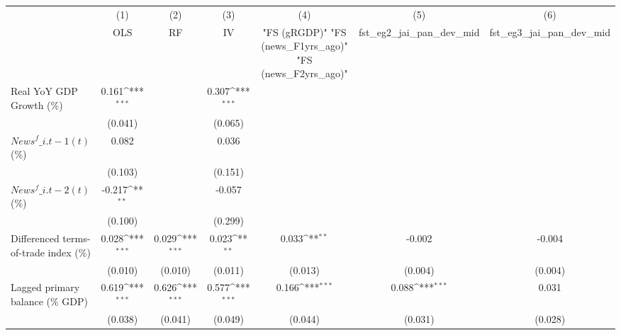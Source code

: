 {
\def\sym#1{\ifmmode^{#1}\else\(^{#1}\)\fi}
\begin{tabular}{l*{6}{c}}
\toprule
                    &\multicolumn{1}{c}{(1)}&\multicolumn{1}{c}{(2)}&\multicolumn{1}{c}{(3)}&\multicolumn{1}{c}{(4)}&\multicolumn{1}{c}{(5)}&\multicolumn{1}{c}{(6)}\\
                    &\multicolumn{1}{c}{OLS}&\multicolumn{1}{c}{RF}&\multicolumn{1}{c}{IV}&\multicolumn{1}{c}{ "FS (gRGDP)"  "FS (news\_F1yrs\_ago)"  "FS (news\_F2yrs\_ago)" }&\multicolumn{1}{c}{fst\_eg2\_jai\_pan\_dev\_mid}&\multicolumn{1}{c}{fst\_eg3\_jai\_pan\_dev\_mid}\\
\midrule
Real YoY GDP Growth (\%)&       0.161\sym{***}&                     &       0.307\sym{***}&                     &                     &                     \\
                    &     (0.041)         &                     &     (0.065)         &                     &                     &                     \\
\addlinespace
$ News^f\_{i.t-1}(t)$ (\%)&       0.082         &                     &       0.036         &                     &                     &                     \\
                    &     (0.103)         &                     &     (0.151)         &                     &                     &                     \\
\addlinespace
$ News^f\_{i.t-2}(t)$ (\%)&      -0.217\sym{**} &                     &      -0.057         &                     &                     &                     \\
                    &     (0.100)         &                     &     (0.299)         &                     &                     &                     \\
\addlinespace
Differenced terms-of-trade index (\%)&       0.028\sym{***}&       0.029\sym{***}&       0.023\sym{**} &       0.033\sym{**} &      -0.002         &      -0.004         \\
                    &     (0.010)         &     (0.010)         &     (0.011)         &     (0.013)         &     (0.004)         &     (0.004)         \\
\addlinespace
Lagged primary balance (\% GDP)&       0.619\sym{***}&       0.626\sym{***}&       0.577\sym{***}&       0.166\sym{***}&       0.088\sym{***}&       0.031         \\
                    &     (0.038)         &     (0.041)         &     (0.049)         &     (0.044)         &     (0.031)         &     (0.028)         \\

\end{tabular}}

